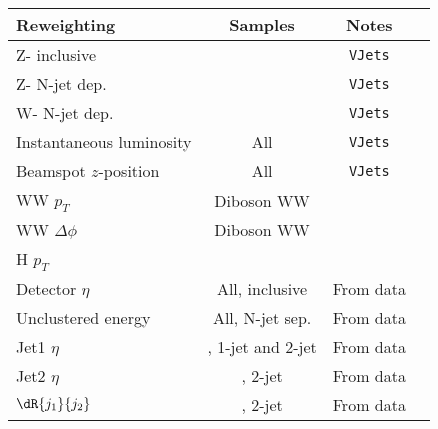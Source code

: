 \begin{center}
\begin{tabular}{ l  c  c c }
  \toprule
  Reweighting                & Samples               & Notes  \\
  \midrule
  Z-\pt{} inclusive          & \zGamJets{}           &   \verb=VJets= \\
  Z-\pt{} N-jet dep.         & \zGamJets{}           &   \verb=VJets= \\
  W-\pt{} N-jet dep.         & \wJets{}              &   \verb=VJets= \\
  Instantaneous luminosity   & All                   &   \verb=VJets= \\
  Beamspot $z$-position      & All                   &   \verb=VJets= \\
  WW $p_T$                   & Diboson WW            &   \mcatnlo{} \\
  WW $\Delta\phi$            & Diboson WW            &   \sherpa{} \\
  H $p_T$                    & \ggHww{}              &   \hqt{} \\
  Detector $\eta$            & All, inclusive        &   From data\\
  Unclustered energy         & All, N-jet sep.       &   From data\\
  Jet1 $\eta$                & \zGam{}, 1-jet and 2-jet  &   From data\\
  Jet2 $\eta$                & \zGam{}, 2-jet            &   From data\\
  $\dR{j_1}{j_2}$            & \zGam{}, 2-jet            &   From data\\
\bottomrule
\end{tabular}
\label{tb:reweightings}
\end{center}
